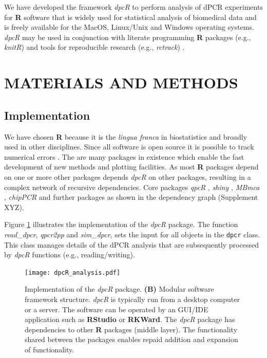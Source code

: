 \documentclass[a4,center,fleqn]{NAR}
\begin{document}
\enlargethispage{-65.1pt}
We have developed the framework \textit{dpcR} to perform analysis of dPCR 
experiments for \textbf{R} software that is widely used for statistical analysis 
of biomedical data and is freely available for the MacOS, Linux/Unix and Windows 
operating systems. \textit{dpcR}  may be used in conjunction with literate 
programming \textbf{R} packages (e.g., \textit{knitR}) and tools for 
reproducible research (e.g.,  \textit{rctrack}) \cite{liu_r_2014, rodiger_r_2015}. 

\section{MATERIALS AND METHODS}

\subsection{Implementation}

We have chosen \textbf{R} because it is the \textit{lingua franca} in 
biostatistics and broadly used in other disciplines. Since all software is open 
source it is possible to track numerical errors \cite{rodiger_r_2015}. The are 
many packages in existence which enable the fast development of new methods and 
plotting facilities. As most \textbf{R} packages depend on one or more other 
packages \cite{ooms_2013} depends \textit{dpcR} on other packages, resulting in 
a complex network of recursive dependencies. Core packages \textit{qpcR} 
\cite{ritz_qpcr_2008}, \textit{shiny} \cite{shiny}, \textit{MBmca} 
\cite{rodiger_surface_2013}, \textit{chipPCR} \cite{roediger2015chippcr} and 
further packages as shown in the dependency graph (Supplement XYZ).

Figure \ref{dpcR_framework} illustrates the implementation of the \textit{dpcR} 
package. The function \textit{read\_dpcr}, \textit{qpcr2pp} and 
\textit{sim\_dpcr}, sets the input for all objects in the \texttt{dpcr} class. 
This class manages details of the dPCR analysis that are subsequently processed 
by \textit{dpcR} functions (e.g., reading/writing).

\begin{figure}[t]
\begin{center}
\texttt{[image: dpcR\_analysis.pdf]}
\end{center}
\caption{Implementation of the \textit{dpcR} package. \textbf{(B)} Modular software 
framework structure. \textit{dpcR} is typically run from a desktop computer or a 
server. The software can be operated by an GUI/IDE application such as 
\textbf{RStudio} or \textbf{RKWard}. The \textit{dpcR} package has dependencies 
to other \textbf{R} packages (middle layer). The functionality shared between 
the packages enables repaid addition and expansion of functionality.}
\label{dpcR_framework}
\end{figure}
\end{document}
